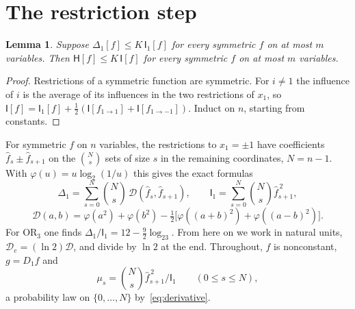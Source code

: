 \documentclass[11pt]{amsart}
\newtheorem{lemma}[theorem]{Lemma}
\theoremstyle{definition}
\theoremstyle{remark}
\newcommand{\HH}{\mathsf H}
\newcommand{\I}{\mathsf I}
\newcommand{\wh}[1]{\widehat{#1}}
\begin{document}
\section{The restriction step}\label{sec:restriction}

\begin{lemma}\label{lem:induction}
Suppose $\Delta_1[f]\le K\,\I_1[f]$ for every symmetric $f$ on at most $m$ variables. Then $\HH[f]\le K\,\I[f]$ for every symmetric $f$ on at most $m$ variables.
\end{lemma}

\begin{proof}
Restrictions of a symmetric function are symmetric. For $i\ne1$ the influence of $i$ is the average of its influences in the two restrictions of $x_1$, so $\I[f]=\I_1[f]+\frac12(\I[f_{1\to1}]+\I[f_{1\to-1}])$. Induct on $n$, starting from constants.
\end{proof}

For symmetric $f$ on $n$ variables, the restrictions to $x_1=\pm1$ have coefficients $\wh f_s\pm\wh f_{s+1}$ on the $\binom Ns$ sets of size $s$ in the remaining coordinates, $N=n-1$. With $\varphi(u)=u\log_2(1/u)$ this gives the exact formulas
\begin{equation}\label{eq:delta}
 \Delta_1=\sum_{s=0}^{N}\binom Ns\,\mathcal D(\wh f_s,\wh f_{s+1}),\qquad \I_1=\sum_{s=0}^N\binom Ns\wh f_{s+1}^{\,2},
\end{equation}
\[
 \mathcal D(a,b)=\varphi(a^2)+\varphi(b^2)-\tfrac12\bigl[\varphi((a+b)^2)+\varphi((a-b)^2)\bigr].
\]
For $\mathrm{OR}_3$ one finds $\Delta_1/\I_1=12-\frac92\log_23$. From here on we work in natural units, $\mathcal D_e=(\ln2)\mathcal D$, and divide by $\ln2$ at the end. Throughout, $f$ is nonconstant, $g=D_1f$ and
\[
 \mu_s=\binom Ns\wh f_{s+1}^{\,2}/\I_1\qquad(0\le s\le N),
\]
a probability law on $\{0,\dots,N\}$ by~\eqref{eq:derivative}.
\end{document}

